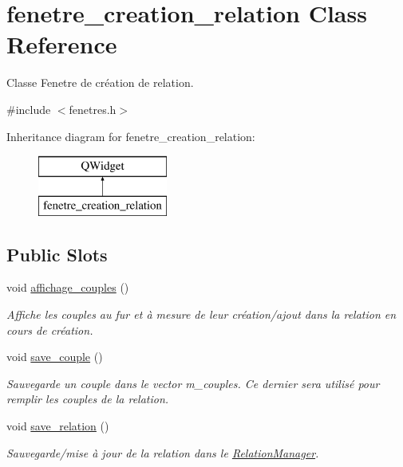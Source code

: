 \hypertarget{classfenetre__creation__relation}{}\section{fenetre\+\_\+creation\+\_\+relation Class Reference}
\label{classfenetre__creation__relation}


Classe Fenetre de création de relation.  




{\ttfamily \#include $<$fenetres.\+h$>$}

Inheritance diagram for fenetre\+\_\+creation\+\_\+relation\+:\begin{figure}[H]
\begin{center}
\leavevmode
\includegraphics[height=2.000000cm]{classfenetre__creation__relation}
\end{center}
\end{figure}
\subsection*{Public Slots}
\begin{DoxyCompactItemize}
\item 
\mbox{\label{classfenetre__creation__relation_ac5b715961f109f3bb403d8ca37faed71}} 
void \hyperlink{classfenetre__creation__relation_ac5b715961f109f3bb403d8ca37faed71}{affichage\+\_\+couples} ()
\begin{DoxyCompactList}\small\item\em Affiche les couples au fur et à mesure de leur création/ajout dans la relation en cours de création. \end{DoxyCompactList}\item 
\mbox{\label{classfenetre__creation__relation_ad8b233b34d0e2775108683e09a8d966d}} 
void \hyperlink{classfenetre__creation__relation_ad8b233b34d0e2775108683e09a8d966d}{save\+\_\+couple} ()
\begin{DoxyCompactList}\small\item\em Sauvegarde un couple dans le vector m\+\_\+couples. Ce dernier sera utilisé pour remplir les couples de la relation. \end{DoxyCompactList}\item 
void \hyperlink{classfenetre__creation__relation_af9891e79cff26ef704cfdae9cfa46752}{save\+\_\+relation} ()
\begin{DoxyCompactList}\small\item\em Sauvegarde/mise à jour de la relation dans le \hyperlink{class_relation_manager}{Relation\+Manager}. \end{DoxyCompactList}\end{DoxyCompactItemize}
